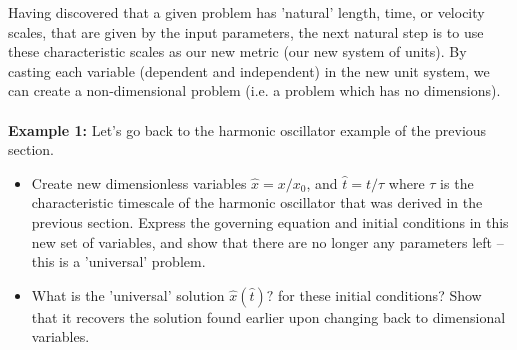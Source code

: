 Having discovered that a given problem has 'natural' length, time, or velocity scales, that are given by the input parameters, the next natural step is to use these characteristic scales as our new metric (our new system of units). By casting each variable (dependent and independent) in the new unit system, we can create a non-dimensional problem (i.e. a problem which has no dimensions). 
\\
\\
{\bf Example 1:} Let's go back to the harmonic oscillator example of the previous section.  
\begin{itemize}
    \item Create new dimensionless variables $\hat x = x/x_0$, and $\hat t = t / \tau$ where $\tau$ is the characteristic timescale of the harmonic oscillator that was derived in the previous section. Express the governing equation and initial conditions in this new set of variables, and show that there are no longer any parameters left -- this is a 'universal' problem. 
    \item What is the 'universal' solution $\hat x(\hat t)?$ for these initial conditions? Show that it recovers the solution found earlier upon changing back to dimensional variables.
\end{itemize}
\\
